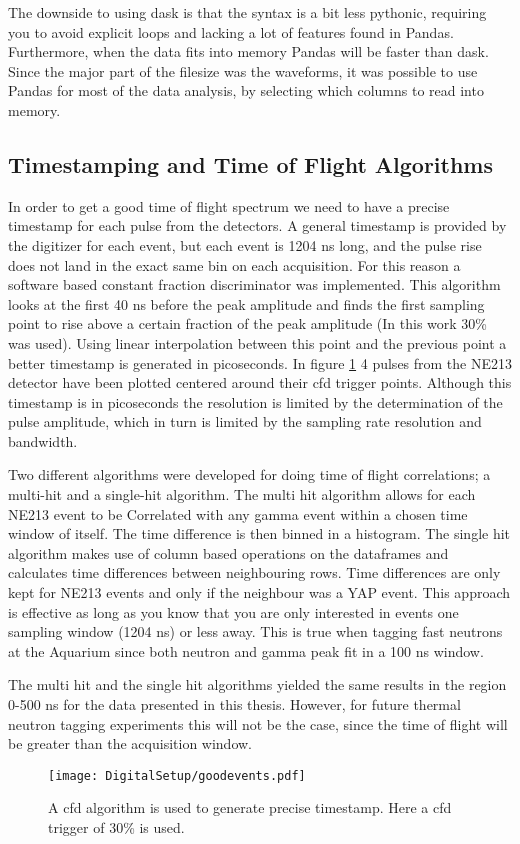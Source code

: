 \documentclass[main.tex]{subfiles}
\begin{document}
The downside to using dask is that the syntax is a bit less pythonic, requiring you to avoid explicit loops and lacking a lot of features found in Pandas. Furthermore, when the data fits into memory Pandas will be faster than dask. Since the major part of the filesize was the waveforms, it was possible to use Pandas for most of the data analysis, by selecting which columns to read into memory.




\subsection{Timestamping and Time of Flight Algorithms}
In order to get a good time of flight spectrum we need to have a precise timestamp for each pulse from the detectors. A general timestamp is provided by the digitizer for each event, but each event is 1204 ns long, and the pulse rise does not land in the exact same bin on each acquisition. For this reason a software based constant fraction discriminator was implemented. This algorithm looks at the first 40 ns before the peak amplitude and finds the first sampling point to rise above  a certain fraction of the peak amplitude (In this work 30\% was used). Using linear interpolation between this point and the previous point a better timestamp is generated in picoseconds. In figure \ref{fig:cfd_trig} 4 pulses from the NE213 detector have been plotted centered around their cfd trigger points. Although this timestamp is in picoseconds the resolution is limited by the determination of the pulse amplitude, which in turn is limited by the sampling rate resolution and bandwidth. 

Two different algorithms were developed for doing time of flight correlations; a multi-hit and a single-hit algorithm. The multi hit algorithm allows for each NE213 event to be Correlated with any gamma event within a chosen time window of itself. The time difference is then binned in a histogram. 
The single hit algorithm makes use of column based operations on the dataframes and calculates time differences between neighbouring rows. Time differences are only kept for NE213 events and only if the neighbour was a YAP event. This approach is effective as long as you know that you are only interested in events one sampling window (1204 ns) or less away. This is true when tagging fast neutrons at the Aquarium since both neutron and gamma peak fit in a 100 ns window. 

The multi hit and the single hit algorithms yielded the same results in the region 0-500 ns for the data presented in this thesis. However, for future thermal neutron tagging experiments this will not be the case, since the time of flight will be greater than the acquisition window.
\begin{figure}[ht!]
    \centering
        \texttt{[image: DigitalSetup/goodevents.pdf]}
        \caption{A cfd algorithm is used to generate precise timestamp. Here a cfd trigger of 30\% is used.}
    \label{fig:cfd_trig} 
\end{figure}
\end{document}
